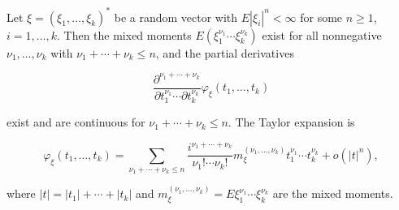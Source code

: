 Let $\xi = (\xi_1, \ldots, \xi_k)^*$ be a random vector with $E|\xi_i|^n < \infty$ for some $n \geq 1$, $i = 1, \ldots, k$. Then the mixed moments $E(\xi_1^{\nu_1} \cdots \xi_k^{\nu_k})$ exist for all nonnegative $\nu_1, \ldots, \nu_k$ with $\nu_1 + \cdots + \nu_k \leq n$, and the partial derivatives

$$\frac{\partial^{\nu_1 + \cdots + \nu_k}}{\partial t_1^{\nu_1} \cdots \partial t_k^{\nu_k}} \varphi_\xi(t_1, \ldots, t_k)$$

exist and are continuous for $\nu_1 + \cdots + \nu_k \leq n$. The Taylor expansion is

$$\varphi_\xi(t_1, \ldots, t_k) = \sum_{\nu_1 + \cdots + \nu_k \leq n} \frac{i^{\nu_1 + \cdots + \nu_k}}{\nu_1! \cdots \nu_k!} m_\xi^{(\nu_1, \ldots, \nu_k)} t_1^{\nu_1} \cdots t_k^{\nu_k} + o(|t|^n),$$

where $|t| = |t_1| + \cdots + |t_k|$ and $m_\xi^{(\nu_1, \ldots, \nu_k)} = E \xi_1^{\nu_1} \cdots \xi_k^{\nu_k}$ are the mixed moments.
